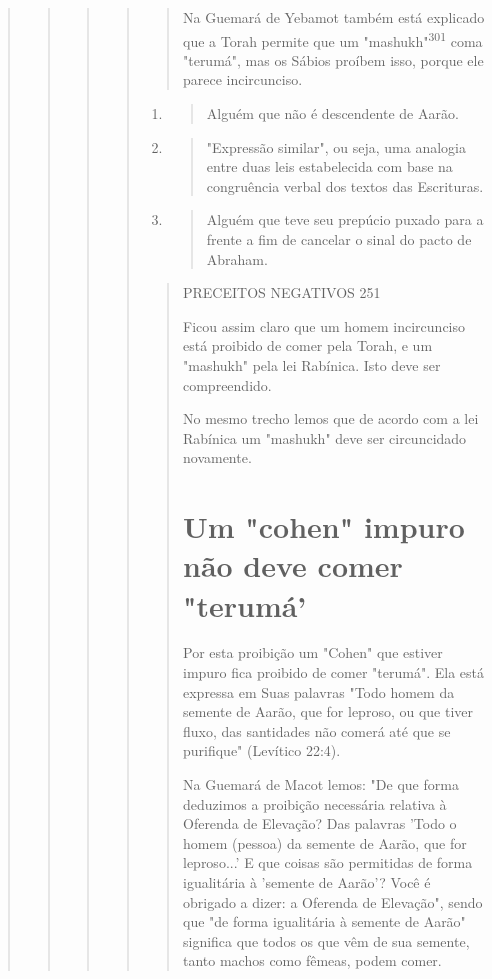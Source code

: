 \begin{quote}
\begin{quote}
\begin{quote}
\begin{quote}
\begin{quote}
Na Guemará de Yebamot também está explicado que a Torah per­mite que um
"mashukh"\textsuperscript{301} coma "terumá", mas os Sábios proíbem
isso, por­que ele parece incircunciso.
\end{quote}

\begin{enumerate}
\def\labelenumi{\arabic{enumi}.}
\setcounter{enumi}{298}
\item
 \begin{quote}
 Alguém que não é descendente de Aarão.
 \end{quote}
\item
 \begin{quote}
 "Expressão similar", ou seja, uma analogia entre duas leis
 estabelecida com base na congruência verbal dos textos das Escrituras.
 \end{quote}
\item
 \begin{quote}
 Alguém que teve seu prepúcio puxado para a frente a fim de cancelar o
 sinal do pacto de Abraham.
 \end{quote}
\end{enumerate}

\begin{quote}
PRECEITOS NEGATIVOS 251

Ficou assim claro que um homem incircunciso está proibido de co­mer pela
Torah, e um "mashukh" pela lei Rabínica. Isto deve ser compreendido.

No mesmo trecho lemos que de acordo com a lei Rabínica um "mas­hukh"
deve ser circuncidado novamente.

\section{Um "cohen" impuro não deve comer "terumá'}

Por esta proibição um "Cohen" que estiver impuro fica proibido de comer
"terumá". Ela está expressa em Suas palavras "Todo homem da semen­te de
Aarão, que for leproso, ou que tiver fluxo, das santidades não comerá
até que se purifique" (Levítico 22:4).

Na Guemará de Macot lemos: "De que forma deduzimos a proibição
necessária relativa à Oferenda de Elevação? Das palavras 'Todo o homem
(pes­soa) da semente de Aarão, que for leproso...' E que coisas são
permitidas de forma igualitária à 'semente de Aarão'? Você é obrigado a
dizer: a Oferenda de Elevação", sendo que "de forma igualitária à
semente de Aarão" significa que todos os que vêm de sua semente, tanto
machos como fêmeas, podem comer.


\end{quote}
\end{quote}
\end{quote}
\end{quote}
\end{quote}
